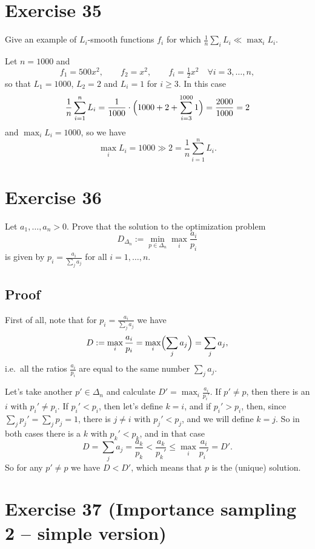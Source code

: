 \documentclass[11pt,a4paper]{article}
\begin{document}
\section*{Exercise 35}

Give an example of $L_i$-smooth functions $f_i$ for which
$\frac{1}{n}\sum_i L_i \ll \max_i L_i$.

\bigskip
Let $n = 1000$ and
\[
  f_1 = 500x^2, \qquad f_2 = x^2, \qquad f_i = \tfrac{1}{2}x^2 \quad \forall i = 3,\dots,n,
\]
so that $L_1 = 1000$, $L_2 = 2$ and $L_i = 1$ for $i \ge 3$. In this case
\[
  \frac{1}{n}\sum_{i=1}^n L_i = \frac{1}{1000}\cdot\Bigl(1000 + 2 + \sum_{i=3}^{1000} 1\Bigr)
  = \frac{2000}{1000} = 2
\]
and $\max_i L_i = 1000$, so we have
\[
  \max_i L_i = 1000 \gg 2 = \frac{1}{n}\sum_{i=1}^n L_i .
\]

\section*{Exercise 36}

Let $a_1,\dots,a_n > 0$. Prove that the solution to the optimization problem
\[
  D_{\Delta_n} := \min_{p \in \Delta_n} \max_i \frac{a_i}{p_i}
\]
is given by $p_i = \frac{a_i}{\sum_j a_j}$ for all $i = 1,\dots,n$.

\subsection*{Proof}
First of all, note that for $p_i = \frac{a_i}{\sum_j a_j}$ we have
\[
  D := \max_i \frac{a_i}{p_i} = \max_i \Bigl(\sum_j a_j\Bigr) = \sum_j a_j ,
\]
i.e.\ all the ratios $\frac{a_i}{p_i}$ are equal to the same number $\sum_j a_j$.

Let's take another $p' \in \Delta_n$ and calculate $D' = \max_i \frac{a_i}{p_i'}$. If $p' \ne p$,
then there is an $i$ with $p_i' \ne p_i$. If $p_i' < p_i$, then let's define $k = i$, and if
$p_i' > p_i$, then, since $\sum_j p_j' = \sum_j p_j = 1$, there is $j \ne i$ with $p_j' < p_j$, and
we will define $k = j$. So in both cases there is a $k$ with $p_k' < p_k$, and in that case
\[
  D = \sum_j a_j = \frac{a_k}{p_k} < \frac{a_k}{p_k'} \le \max_i \frac{a_i}{p_i'} = D' .
\]
So for any $p' \ne p$ we have $D < D'$, which means that $p$ is the (unique) solution.

\section*{Exercise 37 (Importance sampling 2 -- simple version)}
\end{document}
